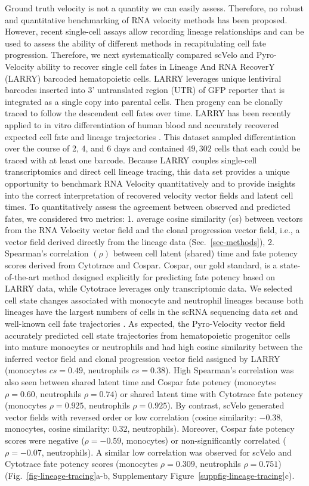 \documentclass[
  sn-mathphys-num,
  lineno,
  twocolumn]{sn-jnl}
\begin{document}
Ground truth velocity is not a quantity we can easily assess. Therefore,
no robust and quantitative benchmarking of RNA velocity methods has been
proposed. However, recent single-cell assays allow recording lineage
relationships and can be used to assess the ability of different methods
in recapitulating cell fate progression. Therefore, we next
systematically compared scVelo and Pyro-Velocity ability to recover
single cell fates in Lineage And RNA RecoverY (LARRY) barcoded
hematopoietic cells. LARRY leverages unique lentiviral barcodes inserted
into 3' untranslated region (UTR) of GFP reporter that is integrated as
a single copy into parental cells. Then progeny can be clonally traced
to follow the descendent cell fates over time. LARRY has been recently
applied to in vitro differentiation of human blood and accurately
recovered expected cell fate and lineage trajectories
\citep{Weinreb2020-mv}. This dataset sampled differentiation over the
course of 2, 4, and 6 days and contained \(49,302\) cells that each
could be traced with at least one barcode. Because LARRY couples
single-cell transcriptomics and direct cell lineage tracing, this data
set provides a unique opportunity to benchmark RNA Velocity
quantitatively and to provide insights into the correct interpretation
of recovered velocity vector fields and latent cell times. To
quantitatively assess the agreement between observed and predicted
fates, we considered two metrics: 1. average cosine similarity (cs)
between vectors from the RNA Velocity vector field and the clonal
progression vector field, i.e., a vector field derived directly from the
lineage data (Sec.~\ref{sec-methods}), 2. Spearman's correlation
\((\rho)\) between cell latent (shared) time and fate potency scores
derived from Cytotrace and Cospar. Cospar, our gold standard, is a
state-of-the-art method designed explicitly for predicting fate potency
based on LARRY data, while Cytotrace leverages only transcriptomic data.
We selected cell state changes associated with monocyte and neutrophil
lineages because both lineages have the largest numbers of cells in the
scRNA sequencing data set and well-known cell fate trajectories
\citep{Petukhov2018-nr}. As expected, the Pyro-Velocity vector field
accurately predicted cell state trajectories from hematopoietic
progenitor cells into mature monocytes or neutrophils and had high
cosine similarity between the inferred vector field and clonal
progression vector field assigned by LARRY (monocytes \(cs=0.49\),
neutrophils \(cs=0.38\)). High Spearman's correlation was also seen
between shared latent time and Cospar fate potency (monocytes
\(\rho=0.60\), neutrophils \(\rho=0.74\)) or shared latent time with
Cytotrace fate potency (monocytes \(\rho=0.925\), neutrophils
\(\rho=0.925\)). By contrast, scVelo generated vector fields with
reversed order or low correlation (cosine similarity: \(-0.38\),
monocytes, cosine similarity: \(0.32\), neutrophils). Moreover, Cospar
fate potency scores were negative (\(\rho=-0.59\), monocytes) or
non-significantly correlated (\(\rho=-0.07\), neutrophils). A similar
low correlation was observed for scVelo and Cytotrace fate potency
scores (monocytes \(\rho=0.309\), neutrophils \(\rho=0.751\))
(Fig.~\ref{fig-lineage-tracing}a-b,
Supplementary Figure~\ref{suppfig-lineage-tracing}c).
\end{document}
